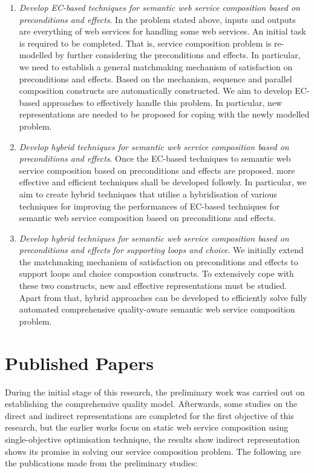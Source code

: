 \begin{enumerate}
\begin{enumerate}
  \item \emph{Develop EC-based techniques for semantic web service composition based on preconditions and effects}. In the problem stated above, inputs and outputs are everything of web services for handling some web services. An initial task is required to be completed. That is, service composition problem is re-modelled by further considering the preconditions and effects. In particular, we need to establish a general matchmaking mechanism of satisfaction on preconditions and effects. Based on the mechanism, sequence and parallel composition constructs are automatically constructed. We aim to develop EC-based approaches to effectively handle this problem. In particular, new representations are needed to be proposed for coping with the newly modelled problem.

  \item \emph{Develop hybrid techniques for semantic web service composition based on preconditions and effects}. Once the EC-based techniques to semantic web service composition based on preconditions and effects are proposed. more effective and efficient techniques shall be developed followly. In particular, we aim to create hybrid techniques that utilise a hybridisation of various techniques for improving the performances of EC-based techniques for semantic web service composition based on preconditions and effects.
    
   \item \emph{Develop hybrid techniques for semantic web service composition based on preconditions and effects for supporting loops and choice}. We initially extend the matchmaking mechanism of satisfaction on preconditions and effects to support loops and choice compostion constructs. To extensively cope with these two constructs, new and effective representations must be studied. Apart from that,  hybrid approaches can be developed to efficiently solve fully automated comprehensive quality-aware semantic web service composition problem.

 
 \end{enumerate}
 
\end{enumerate}

\section{Published Papers}

During the initial stage of this research, the preliminary work was carried out on establishing the comprehensive quality model.  Afterwards, some studies on the direct and indirect representations are completed for the first objective of this research, but the earlier works focus on static web service composition using single-objective optimisation technique, the results show indirect representation shows its promise in solving our service composition problem.  The following are the publications made from the preliminary studies:

